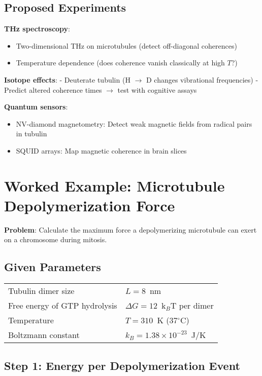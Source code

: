 \subsection{Proposed Experiments}\label{proposed-experiments}

\textbf{THz spectroscopy}:
\begin{itemize}
\item Two-dimensional THz on microtubules (detect
off-diagonal coherences)
\item Temperature dependence (does coherence vanish
classically at high \(T\)?)
\end{itemize}


\textbf{Isotope effects}: - Deuterate tubulin (H
$\rightarrow$ D changes vibrational frequencies) -
Predict altered coherence times $\rightarrow$ test with
cognitive assays

\textbf{Quantum sensors}:
\begin{itemize}
\item NV-diamond magnetometry: Detect weak
magnetic fields from radical pairs in tubulin
\item SQUID arrays: Map
magnetic coherence in brain slices
\end{itemize}


\section{Worked Example: Microtubule Depolymerization Force}
\label{sec:worked-example}

\textbf{Problem}: Calculate the maximum force a depolymerizing microtubule can exert on a chromosome during mitosis.

\subsection*{Given Parameters}

\begin{tabular}{@{}ll@{}}
Tubulin dimer size & $L = 8$~nm \\
Free energy of GTP hydrolysis & $\Delta G = 12$~k$_B$T per dimer \\
Temperature & $T = 310$~K (37$^\circ$C) \\
Boltzmann constant & $k_B = 1.38 \times 10^{-23}$~J/K \\
\end{tabular}

\subsection*{Step 1: Energy per Depolymerization Event}

